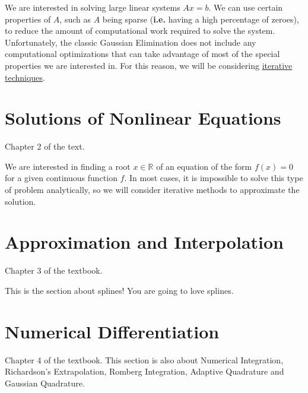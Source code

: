 \documentclass[12pt]{book}
\newcommand{\ie}{\textbf{i.e.}\xspace}
\begin{document}
We are interested in solving large linear systems $Ax = b$. We can use certain
properties of $A$, such as $A$ being sparse (\ie having a high percentage of
zeroes), to reduce the amount of computational work required to solve the
system. Unfortunately, the classic Gaussian Elimination does not include any
computational optimizations that can take advantage of most of the special
properties we are interested in. For this reason, we will be considering
\uline{iterative techniques}.







\chapter{Solutions of Nonlinear Equations} 
\begin{greenquote}
  Chapter 2 of the text.
\end{greenquote}

We are interested in finding a root $x \in \mathbb{R}$ of an equation of the
form $f(x) = 0$ for a given continuous function $f$. In most cases, it is
impossible to solve this type of problem analytically, so we will consider
iterative methods to approximate the solution.









\chapter{Approximation and Interpolation}
\begin{greenquote}
  Chapter 3 of the textbook.
\end{greenquote}

This is the section about splines! You are going to love splines.







\chapter{Numerical Differentiation}
\begin{greenquote}
  Chapter 4 of the textbook. This section is also about Numerical Integration,
  Richardson's Extrapolation, Romberg Integration, Adaptive Quadrature and
  Gaussian Quadrature.
\end{greenquote}
\end{document}
